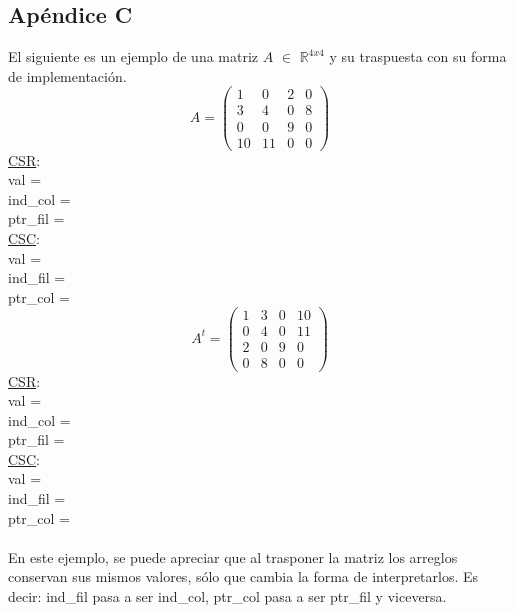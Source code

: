 \documentclass[a4paper]{article}
\begin{document}
	\subsection{Ap\'endice C}
El siguiente es un ejemplo de una matriz $A$ $\in$ $\mathbb{R}^{4x4}$ y su traspuesta con su forma de implementaci\'on.\\
\begin{equation}
A = \left(
\begin{array}{cccc}
1 & 0 & 2 & 0 \\
3 & 4 & 0 & 8 \\
0 & 0 & 9 & 0 \\
10 & 11 & 0 & 0
\end{array}
\right)
\end{equation}
 \underline{CSR}:\\
 \indent \indent val = \indent \indent  [1,2,3,4,8,9,10,11]\\
 \indent \indent ind_col = \indent [0,2,0,1,3,2,0,1]\\
 \indent \indent ptr_fil = \indent [0,2,5,6,8]\\
 \underline{CSC}:\\
 \indent \indent val = \indent \indent [1,3,10,4,11,2,9,8]\\
 \indent \indent ind_fil = \indent [0,1,3,1,3,0,2,1]\\
 \indent \indent ptr_col = \indent [0,3,5,7,8]\\
\begin{equation}
A^t = \left(
\begin{array}{cccc}
1 & 3 & 0 & 10 \\
0 & 4 & 0 & 11 \\
2 & 0 & 9 & 0 \\
0 & 8 & 0 & 0
\end{array}
\right)
\end{equation}
 \underline{CSR}:\\
 \indent \indent val = \indent \indent [1,3,10,4,11,2,9,8]\\
 \indent \indent ind_col = \indent [0,1,3,1,3,0,2,1]\\
 \indent \indent ptr_fil = \indent [0,3,5,7,8]\\
 \underline{CSC}:\\
 \indent \indent val = \indent \indent  [1,2,3,4,8,9,10,11]\\
 \indent \indent ind_fil = \indent [0,2,0,1,3,2,0,1]\\
 \indent \indent ptr_col = \indent [0,2,5,6,8]\\
 \\
 En este ejemplo, se puede apreciar que al trasponer la matriz los arreglos conservan sus mismos valores, s\'olo que cambia la forma de interpretarlos. Es decir: ind_fil pasa a ser ind_col, ptr_col pasa a ser ptr_fil y viceversa.
\newpage
\end{document}
